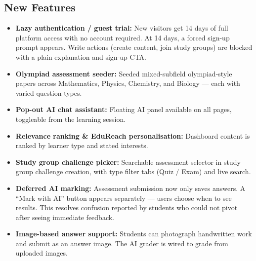 \documentclass[12pt,a4paper]{article}
\begin{document}
\subsection{New Features}
\begin{itemize}[leftmargin=1.4em, itemsep=3pt]
  \item \textbf{Lazy authentication / guest trial:}
        New visitors get 14 days of full platform access with no account required.
        At 14 days, a forced sign-up prompt appears. Write actions (create content,
        join study groups) are blocked with a plain explanation and sign-up CTA.
  \item \textbf{Olympiad assessment seeder:}
        Seeded mixed-subfield olympiad-style papers across Mathematics, Physics,
        Chemistry, and Biology — each with varied question types.
  \item \textbf{Pop-out AI chat assistant:}
        Floating AI panel available on all pages, toggleable from the learning session.
  \item \textbf{Relevance ranking \& EduReach personalisation:}
        Dashboard content is ranked by learner type and stated interests.
  \item \textbf{Study group challenge picker:}
        Searchable assessment selector in study group challenge creation,
        with type filter tabs (Quiz / Exam) and live search.
  \item \textbf{Deferred AI marking:}
        Assessment submission now only saves answers.
        A ``Mark with AI'' button appears separately — users choose when to see results.
        This resolves confusion reported by students who could not pivot after seeing
        immediate feedback.
  \item \textbf{Image-based answer support:}
        Students can photograph handwritten work and submit as an answer image.
        The AI grader is wired to grade from uploaded images.
\end{itemize}
\end{document}
